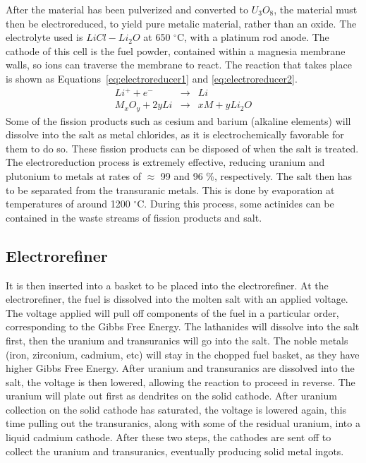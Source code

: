 After the material has been pulverized and converted to $U_3O_8$, the material must then be electroreduced, to yield pure metalic material, rather than an oxide. The electrolyte used is $LiCl-Li_2O$ at 650 $^{\circ}$C, with a platinum rod anode. The cathode of this cell is the fuel powder, contained within a magnesia membrane walls, so ions can traverse the membrane to react. The reaction that takes place is shown as Equations~\eqref{eq:electroreducer1} and \eqref{eq:electroreducer2}.
%
\begin{eqnarray}
\label{eq:electroreducer1}
Li^+ + e^- & \rightarrow & Li \\
\label{eq:electroreducer2}
M_xO_y + 2yLi & \rightarrow & xM + yLi_2O
\end{eqnarray}
%
Some of the fission products such as cesium and barium (alkaline elements) will dissolve into the salt as metal chlorides, as it is electrochemically favorable for them to do so. These fission products can be disposed of when the salt is treated. The electroreduction process is extremely effective, reducing uranium and plutonium to metals at rates of $\approx$ 99 and 96 \%, respectively. The salt then has to be separated from the transuranic metals. This is done by evaporation at temperatures of around 1200 $^{\circ}$C. During this process, some actinides can be contained in the waste streams of fission products and salt. 

\subsection{Electrorefiner}
 It is then inserted into a basket to be placed into the electrorefiner. At the electrorefiner, the fuel is dissolved into the molten salt with an applied voltage. The voltage applied will pull off components of the fuel in a particular order, corresponding to the Gibbs Free Energy. The lathanides will dissolve into the salt first, then the  uranium and transuranics will go into the salt. The noble metals (iron, zirconium, cadmium, etc) will stay in the chopped fuel basket, as they have higher Gibbs Free Energy. After uranium and transuranics are dissolved into the salt, the voltage is then lowered, allowing the reaction to proceed in reverse. The uranium will plate out first as dendrites on the solid cathode. After uranium collection on the solid cathode has saturated, the voltage is lowered again, this time pulling out the transuranics, along with some of the residual uranium, into a liquid cadmium cathode. After these two steps, the cathodes are sent off to collect the uranium and transuranics, eventually producing solid metal ingots. 

